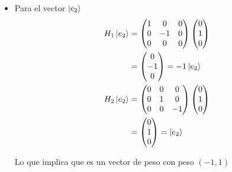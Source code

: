 \documentclass[12pt]{amsart}
\begin{document}
\begin{itemize}
    Lo que implica que es un vector de peso con peso $(1, 0)$

  \item Para el vector $\ket{e_2}$
    \begin{align*}
      H_1 \ket{e_2} &=
      \begin{pmatrix}
        1 &  0 & 0 \\
        0 & -1 & 0 \\
        0 &  0 & 0
      \end{pmatrix} 
      \begin{pmatrix}
        0 \\ 1 \\ 0
      \end{pmatrix}\\
      &= \begin{pmatrix}
        0 \\ -1 \\ 0
      \end{pmatrix} = -1 \ket{e_2}\\
      H_2 \ket{e_2} &=
      \begin{pmatrix}
        0 &  0 & 0 \\
        0 &  1 & 0 \\
        0 &  0 & -1
      \end{pmatrix} 
      \begin{pmatrix}
        0 \\ 1 \\ 0
      \end{pmatrix}\\
      &= \begin{pmatrix}
        0 \\ 1 \\ 0
      \end{pmatrix} = \ket{e_2}\\
    \end{align*}

    Lo que implica que es un vector de peso con peso $(-1, 1)$


\end{itemize}
\end{document}
